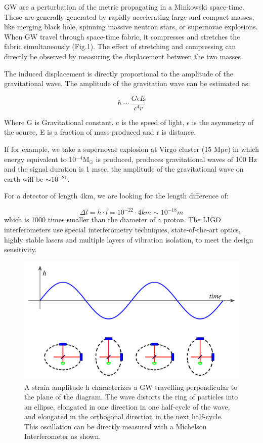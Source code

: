\documentclass[conference]{IEEEtran}
\begin{document}
GW are a perturbation of the metric propagating in a Minkowski space-time. These are generally generated by rapidly accelerating large and compact masses, like merging black hole, spinning massive neutron stars, or supernovae explosions. When GW travel through space-time fabric, it compresses and stretches the fabric simultaneously (Fig.1). The effect of stretching and compressing can directly be observed by measuring the displacement between the two masses\cite{Kokkotas_2008,Calloni:2017whl}.

The induced displacement is directly proportional to the amplitude of the gravitational wave. The amplitude of the gravitation wave can be estimated as: 

\begin{equation}
h\sim\frac{G\epsilon E}{c^4 r}
\end{equation}

Where G is Gravitational constant, c is the speed of light, $\epsilon$ is the asymmetry of the source, E is a fraction of mass-produced and r is distance\cite{Kokkotas_2008}.

If for example, we take a supernovae explosion at Virgo cluster (15 Mpc) in which energy equivalent to 10${^{-4}}$M{\(_\odot\)} is produced, produces gravitational waves of 100 Hz and the signal duration is 1 msec, the amplitude of the gravitational wave on earth will be $\sim 10{^{-21}}$.

For a detector of length 4km, we are looking for the length difference of:

\begin{equation}
\Delta l = h\cdot l=10^{-22}\cdot 4km \sim 10^{-18}m
\end{equation}
which is 1000 times smaller than the diameter of a proton\cite{Abbott_2009}. The LIGO interferometers use special interferometry techniques, state-of-the-art optics, highly stable lasers and multiple layers of vibration isolation, to meet the design sensitivity.
\begin{figure}[htbp]
\centerline{\includegraphics[scale=0.5]{x1.png}}
\caption{A strain amplitude h characterizes a GW travelling perpendicular to the plane of the diagram. The wave distorts the ring of particles into an ellipse, elongated in one direction in one half-cycle of the wave, and elongated in the orthogonal direction in the next half-cycle. This oscillation can be directly measured with a Michelson Interferometer as shown\cite{Abbott_2009}.}

\end{figure}
\end{document}

